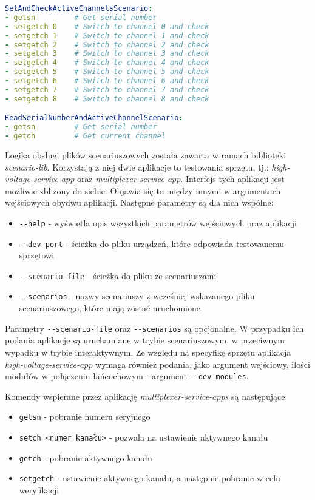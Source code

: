 \begin{lstlisting}[language=yaml,caption={Przykładowy scenariusz w formacie zbliżonym do \emph{YAML}},label={lst:examplary_scenario},frame=single]
SetAndCheckActiveChannelsScenario:
- getsn         # Get serial number
- setgetch 0    # Switch to channel 0 and check
- setgetch 1    # Switch to channel 1 and check
- setgetch 2    # Switch to channel 2 and check
- setgetch 3    # Switch to channel 3 and check
- setgetch 4    # Switch to channel 4 and check
- setgetch 5    # Switch to channel 5 and check
- setgetch 6    # Switch to channel 6 and check
- setgetch 7    # Switch to channel 7 and check
- setgetch 8    # Switch to channel 8 and check

ReadSerialNumberAndActiveChannelScenario:
- getsn         # Get serial number
- getch         # Get current channel
\end{lstlisting}

Logika obsługi plików scenariuszowych została zawarta w ramach biblioteki \emph{scenario-lib}. Korzystają z niej dwie aplikacje to testowania sprzętu, tj.: \emph{high-voltage-service-app} oraz \emph{multiplexer-service-app}. Interfejs tych aplikacji jest możliwie zbliżony do siebie. Objawia się to między innymi w argumentach wejściowych obydwu aplikacji. Następne parametry są dla nich wspólne:
\begin{itemize}
    \item \lstinline{--help} - wyświetla opis wszystkich parametrów wejściowych oraz aplikacji
    \item \lstinline{--dev-port} - ścieżka do pliku urządzeń, które odpowiada testowanemu sprzętowi
    \item \lstinline{--scenario-file} - ścieżka do pliku ze scenariuszami
    \item \lstinline{--scenarios} - nazwy scenariuszy z wcześniej wskazanego pliku scenariuszowego, które mają zostać uruchomione
\end{itemize}

Parametry \lstinline{--scenario-file} oraz \lstinline{--scenarios} są opcjonalne. W przypadku ich podania aplikacje są uruchamiane w trybie scenariuszowym, w przeciwnym wypadku w trybie interaktywnym. Ze względu na specyfikę sprzętu aplikacja \emph{high-voltage-service-app} wymaga również podania, jako argument wejściowy, ilości modułów w połączeniu łańcuchowym - argument \lstinline{--dev-modules}.

Komendy wspierane przez aplikację \emph{multiplexer-service-apps} są następujące:
\begin{itemize}
    \item \lstinline{getsn} - pobranie numeru seryjnego
    \item \lstinline{setch <numer kanału>}  - pozwala na ustawienie aktywnego kanału
    \item \lstinline{getch} - pobranie aktywnego kanału
    \item \lstinline{setgetch} - ustawienie aktywnego kanału, a następnie pobranie w celu weryfikacji
\end{itemize}

